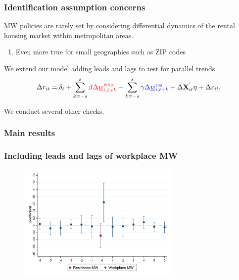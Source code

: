 \documentclass[aspectratio=169, t]{beamer}
\newcommand{\mw}{\underline{w}}
\newcommand{\wkp}{\text{wkp}}
\newcommand{\res}{\text{res}}
\begin{document}
\begin{frame}[label = dyn_model]
    \frametitle{Identification assumption concerns}
    
    MW policies are rarely set by considering differential dynamics of the 
    rental housing market within metropolitan areas.
    \begin{enumerate}
        \item Even more true for small geographies such as ZIP codes
    \end{enumerate}

    \vspace{2mm}
    \pause
    We extend our model adding leads and lags to test for parallel trends
    $$
    \Delta r_{it} = \delta_t +
        \sum_{k=-s}^{s} \beta {\color{red}\Delta \mw^{\wkp}_{i,t+k}} +
        \sum_{k=-s}^{s} \gamma {\color{blue} \Delta \mw^{\res}_{i,t+k}} + 
        \Delta \mathbf{X}^{'}_{it} \eta + 
        \Delta \varepsilon_{it} ,
    $$

    \vspace{2mm}
    We conduct several other checks.
\end{frame}

\begin{frame}[label = static_tab]
    \frametitle{Main results}

    
    \hyperlink{example_pred_chi_07_2019}{}
\end{frame}

\begin{frame}[label = dyn_baseline_plot]
    \frametitle{Including leads and lags of workplace MW}

    \begin{figure}
        \centering
        \vspace{-2mm}
        \includegraphics[width=0.70\textwidth]{fd_baseline/output/fd_both_mw_wkp_only_dynamic.png}
    \end{figure}
    
\end{frame}
\end{document}
